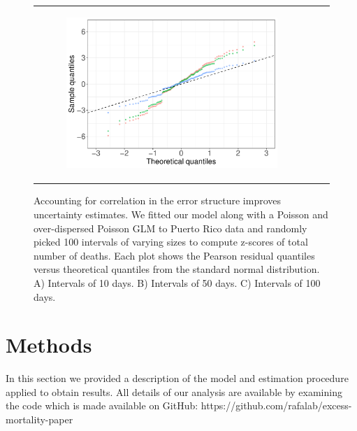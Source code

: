 \documentclass[11pt]{article}
\begin{document}
\begin{figure}[ht]
\begin{tabular}{lll}
\begin{subfigure}[t]{0.3\linewidth}
		\includegraphics[width=1\linewidth]{figs/figure-5c.pdf}
	\end{subfigure}\\
	\end{tabular}
	\caption{Accounting for correlation in the error structure improves uncertainty estimates. We fitted our model along with a Poisson and over-dispersed Poisson GLM to Puerto Rico data and randomly picked 100 intervals of varying sizes to compute z-scores of total number of deaths. Each plot shows the Pearson residual quantiles versus theoretical quantiles from the standard normal distribution. A) Intervals of 10 days. B) Intervals of 50 days. C) Intervals of 100 days.}
	\label{fig:deaths-qqplots}
\end{figure}

\section{Methods}
\label{sec:methods}

In this section we provided a description of the model and estimation procedure applied to obtain results. All details of our analysis are available by examining the code which is made available on GitHub: https://github.com/rafalab/excess-mortality-paper
\end{document}

